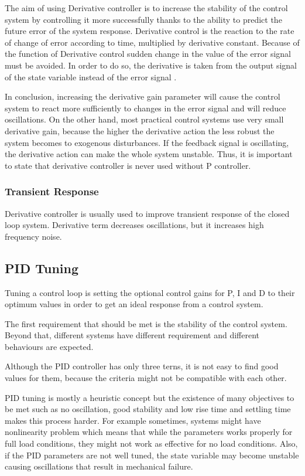 The aim of using Derivative controller is to increase the stability of the control system by controlling it more successfully thanks to the ability to predict the future error of the system response. Derivative control is the reaction to the rate of change of error according to time, multiplied by derivative constant. Because of the function of Derivative control sudden change in the value of the error signal must be avoided. In order to do so, the derivative is taken from the output signal of the state variable instead of the error signal \cite{pid}.

In conclusion, increasing the derivative gain parameter will cause the control system to react more sufficiently to changes in the error signal and will reduce oscillations. On the other hand, most practical control systems use very small derivative gain, because the higher the derivative action the less robust the system becomes to exogenous disturbances. If the feedback signal is oscillating, the derivative action can make the whole system unstable. Thus, it is important to state that derivative controller is never used without P controller.

\subsubsection*{Transient Response}

Derivative controller is usually used to improve transient response of the closed loop system. Derivative term decreases oscillations, but it increases high frequency noise.

\subsection{PID Tuning}

Tuning a control loop is setting the optional control gains for P, I and D to their optimum values in order to get an ideal response from a control system.

The first requirement that should be met is the stability of the control system. Beyond that, different systems have different requirement and different behaviours are expected.

Although the PID controller has only three terns, it is not easy to find good values for them, because the criteria might not be compatible with each other. 
  
PID tuning is mostly a heuristic concept but the existence of many objectives to be met such as no oscillation, good stability and low rise time and settling time makes this process harder. For example sometimes, systems might have nonlinearity problem which means that while the parameters works properly for full load conditions, they might not work as effective for no load conditions. Also, if the PID parameters are not well tuned, the state variable may become unstable causing oscillations that result in mechanical failure.

